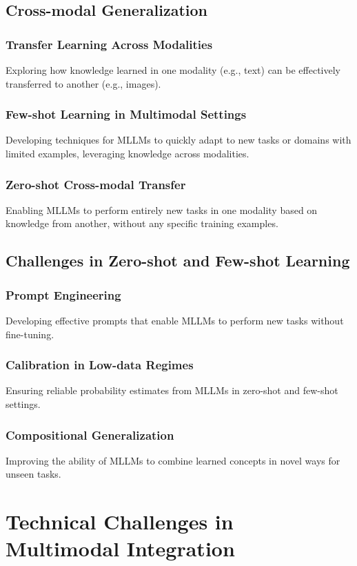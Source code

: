 \subsection{Cross-modal Generalization}
\subsubsection{Transfer Learning Across Modalities}
Exploring how knowledge learned in one modality (e.g., text) can be effectively transferred to another (e.g., images).

\subsubsection{Few-shot Learning in Multimodal Settings}
Developing techniques for MLLMs to quickly adapt to new tasks or domains with limited examples, leveraging knowledge across modalities.

\subsubsection{Zero-shot Cross-modal Transfer}
Enabling MLLMs to perform entirely new tasks in one modality based on knowledge from another, without any specific training examples.

\subsection{Challenges in Zero-shot and Few-shot Learning}
\subsubsection{Prompt Engineering}
Developing effective prompts that enable MLLMs to perform new tasks without fine-tuning.

\subsubsection{Calibration in Low-data Regimes}
Ensuring reliable probability estimates from MLLMs in zero-shot and few-shot settings.

\subsubsection{Compositional Generalization}
Improving the ability of MLLMs to combine learned concepts in novel ways for unseen tasks.

\section{Technical Challenges in Multimodal Integration}

